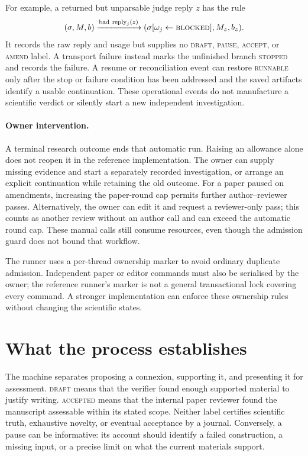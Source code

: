 \documentclass[11pt,a4paper]{article}
\newcommand{\st}[1]{\textsc{#1}}
\begin{document}
For example, a returned but unparsable judge reply \(z\) has the rule
\[
 (\sigma,M,b)\xrightarrow{\mathrm{bad\ reply}_j(z)}
 (\sigma[\omega_j\leftarrow\st{blocked}],M_z,b_z).
\]
It records the raw reply and usage but supplies no \st{draft}, \st{pause},
\st{accept}, or \st{amend} label. A transport failure instead marks the
unfinished branch \st{stopped} and records the failure. A resume or
reconciliation event can restore \st{runnable} only after the stop or failure
condition has been addressed and the saved artifacts identify a usable
continuation. These operational events do not manufacture a scientific verdict
or silently start a new independent investigation.

\paragraph{Owner intervention.}
A terminal research outcome ends that automatic run. Raising an allowance alone
does not reopen it in the reference implementation. The owner can supply missing
evidence and start a separately recorded investigation, or arrange an explicit
continuation while retaining the old outcome. For a paper paused on amendments,
increasing the paper-round cap permits further author--reviewer passes.
Alternatively, the owner can edit it and request a reviewer-only pass; this
counts as another review without an author call and can exceed the automatic
round cap. These manual calls still consume resources, even though the admission
guard does not bound that workflow.

The runner uses a per-thread ownership marker to avoid ordinary duplicate
admission. Independent paper or editor commands must also be serialised by the
owner; the reference runner's marker is not a general transactional lock
covering every command. A stronger implementation can enforce these ownership
rules without changing the scientific states.

\section{What the process establishes}
\label{sec:establishes}

The machine separates proposing a connexion, supporting it, and presenting it
for assessment. \st{draft} means that the verifier found enough supported
material to justify writing. \st{accepted} means that the internal paper
reviewer found the manuscript assessable within its stated scope. Neither label
certifies scientific truth, exhaustive novelty, or eventual acceptance by a
journal. Conversely, a pause can be informative: its account should identify a
failed construction, a missing input, or a precise limit on what the current
materials support.
\end{document}
